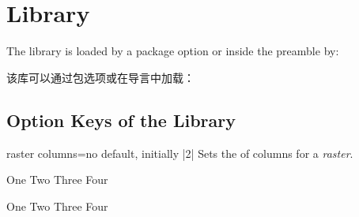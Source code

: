 \setcounter{section}{15}
\section{Library }\label{sec:raster}%
%
The library is loaded by a package option or inside the preamble by:

该库可以通过包选项或在导言中加载：
\begin{dispListing}
\end{dispListing}


% 



\clearpage
\subsection{Option Keys of the Library}\label{subsec:raster_options}

\begin{docTcbKey}[][doc new=2014-11-10]{raster columns}{=}{no default, initially |2|}
  Sets the  of columns for a \emph{raster}.
\begin{dispExample}
\begin{tcbitemize}[raster columns=3,
  size=small,colframe=red!50!black,colback=red!10!white]
  \tcbitem One
  \tcbitem Two
  \tcbitem Three
  \tcbitem Four
\end{tcbitemize}
\begin{tcbitemize}[raster columns=4,
  size=small,colframe=blue!50!black,colback=blue!10!white]
  \tcbitem One
  \tcbitem Two
  \tcbitem Three
  \tcbitem Four
\end{tcbitemize}
\end{dispExample}
\end{docTcbKey}

